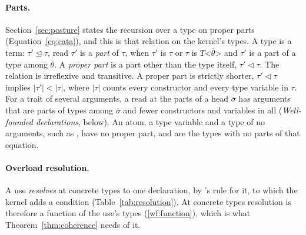 \paragraph{Parts.}
\label{app:fjlt:parts}
Section~\ref{sec:posture} states the recursion over a type on proper parts (Equation~\eqref{eq:cata}), and this is that relation on the kernel's types.
A type is a term: $\tau' \trianglelefteq \tau$, read $\tau'$ is a \emph{part} of $\tau$, when $\tau'$ is $\tau$ or $\tau$ is $T\texttt{<}\overline{\theta}\texttt{>}$ and $\tau'$ is a part of a type among $\overline{\theta}$.
A \emph{proper part} is a part other than the type itself, $\tau' \triangleleft \tau$.
The relation is irreflexive and transitive.
A proper part is strictly shorter, $\tau' \triangleleft \tau$ implies $|\tau'| < |\tau|$, where $|\tau|$ counts every constructor and every type variable in $\tau$.
For a trait of several arguments, a read at the parts of a head $\overline{\sigma}$ has arguments that are parts of types among $\overline{\sigma}$ and fewer constructors and variables in all (\emph{Well-founded declarations}, below).
An atom, a type variable and a type of no arguments, such as , have no proper part, and are the types with no parts of that equation.

\paragraph{Overload resolution.}
A use \emph{resolves} at concrete types to one declaration, by \Cpp{}'s rule for it, to which the kernel adds a condition (Table~\ref{tab:resolution}).
At concrete types resolution is therefore a function of the use's types (\ref{wf:function}), which is what Theorem~\ref{thm:coherence} needs of it.

